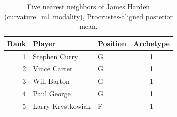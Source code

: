 \begin{table}[htbp]
  \centering\small
  \begin{tabular}{rllc}
    \toprule
    Rank & Player & Position & Archetype \\
    \midrule
    1 & Stephen Curry & G & 1 \\
    2 & Vince Carter & G & 1 \\
    3 & Will Barton & G & 1 \\
    4 & Paul George & G & 1 \\
    5 & Larry Krystkowiak & F & 1 \\
    \bottomrule
  \end{tabular}
  \caption{Five nearest neighbors of James Harden (curvature_m1 modality), Procrustes-aligned posterior mean.}
  \label{tab:James_Harden_neighbors_curvature_m1}
\end{table}

